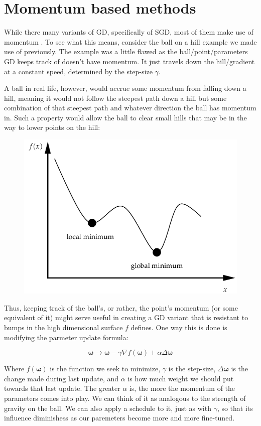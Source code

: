 \documentclass{article}
\begin{document}
\section*{Momentum based methods}
While there many variants of GD, specifically of SGD, most of them make use of momentum \cite{2016arXiv160904747R}. To see what this means, consider the ball on a hill example we made use of previously. The example was a little flawed as the ball/point/parameters GD keeps track of doesn't have momentum. It just travels down the hill/gradient at a constant speed, determined by the step-size $\gamma$.

A ball in real life, however, would accrue some momentum from falling down a hill, meaning it would not follow the steepest path down a hill but some combination of that steepest path and whatever direction the ball has momentum in. Such a property would allow the ball to clear small hills that may be in the way to lower points on the hill:

\begin{figure}[H]
  \centering
  \includegraphics[scale=.45]{local}
\end{figure}

Thus, keeping track of the ball's, or rather, the point's momentum (or some equivalent of it) might serve useful in creating a GD variant that is resistant to bumps in the high dimensional surface $f$ defines. One way this is done is modifying the parmeter update formula:

$$\boldsymbol\omega\rightarrow\boldsymbol\omega-\gamma\nabla f(\boldsymbol\omega)+\alpha\Delta\boldsymbol\omega$$

Where $f(\boldsymbol\omega)$ is the function we seek to minimize, $\gamma$ is the step-size, $\Delta\boldsymbol\omega$ is the change made during last update, and $\alpha$ is how much weight we should put towards that last update. The greater $\alpha$ is, the more the momentum of the parameters comes into play. We can think of it as analogous to the strength of gravity on the ball. We can also apply a schedule to it, just as with $\gamma$, so that its influence diminishess as our paremeters become more and more fine-tuned.
\end{document}
